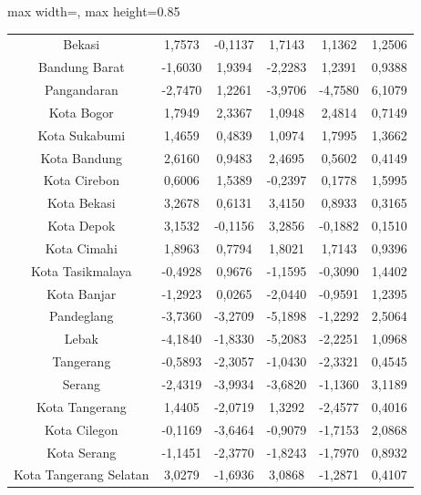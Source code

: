 \begin{table}[H]
\begin{adjustbox}{max width=\textwidth, max height=0.85\textheight}
\begin{tabular}{|c|c|c|c|c|c|}
Bekasi & 1,7573 & -0,1137 & 1,7143 & 1,1362 & 1,2506 \\
Bandung Barat & -1,6030 & 1,9394 & -2,2283 & 1,2391 & 0,9388 \\
Pangandaran & -2,7470 & 1,2261 & -3,9706 & -4,7580 & 6,1079 \\
Kota Bogor & 1,7949 & 2,3367 & 1,0948 & 2,4814 & 0,7149 \\
Kota Sukabumi & 1,4659 & 0,4839 & 1,0974 & 1,7995 & 1,3662 \\
Kota Bandung & 2,6160 & 0,9483 & 2,4695 & 0,5602 & 0,4149 \\
Kota Cirebon & 0,6006 & 1,5389 & -0,2397 & 0,1778 & 1,5995 \\
Kota Bekasi & 3,2678 & 0,6131 & 3,4150 & 0,8933 & 0,3165 \\
Kota Depok & 3,1532 & -0,1156 & 3,2856 & -0,1882 & 0,1510 \\
Kota Cimahi & 1,8963 & 0,7794 & 1,8021 & 1,7143 & 0,9396 \\
Kota Tasikmalaya & -0,4928 & 0,9676 & -1,1595 & -0,3090 & 1,4402 \\
Kota Banjar & -1,2923 & 0,0265 & -2,0440 & -0,9591 & 1,2395 \\
Pandeglang & -3,7360 & -3,2709 & -5,1898 & -1,2292 & 2,5064 \\
Lebak & -4,1840 & -1,8330 & -5,2083 & -2,2251 & 1,0968 \\
Tangerang & -0,5893 & -2,3057 & -1,0430 & -2,3321 & 0,4545 \\
Serang & -2,4319 & -3,9934 & -3,6820 & -1,1360 & 3,1189 \\
Kota Tangerang & 1,4405 & -2,0719 & 1,3292 & -2,4577 & 0,4016 \\
Kota Cilegon & -0,1169 & -3,6464 & -0,9079 & -1,7153 & 2,0868 \\
Kota Serang & -1,1451 & -2,3770 & -1,8243 & -1,7970 & 0,8932 \\
Kota Tangerang Selatan & 3,0279 & -1,6936 & 3,0868 & -1,2871 & 0,4107 \\
\hline
\end{tabular}
\end{adjustbox}
\end{table}